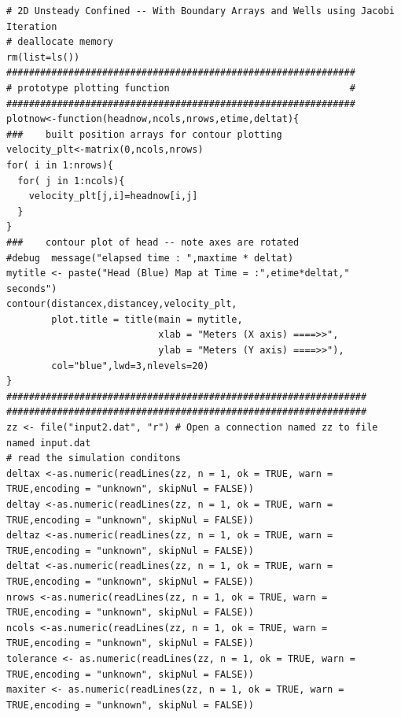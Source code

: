 \begin{lstlisting}[caption= R code demonstrating an Aquifer Flow Simulator for 2D Unsteady Confined Aquifer Flow.  This code fragment implements the Jacobi iteration to solve the linear system at \textbf{each time step}.  A plotting prototype function is used so we can plot to a graphics device at specified intervals (multiples of the total number of time steps).  A graphics device is used (rather than plotting to the \textbf{R Studio} environment) so multiple plots at different simulation times can be rendered , label=lst:2D-Unsteady]
# 2D Unsteady Confined -- With Boundary Arrays and Wells using Jacobi Iteration
# deallocate memory
rm(list=ls())
##############################################################
# prototype plotting function                                #
##############################################################
plotnow<-function(headnow,ncols,nrows,etime,deltat){
###    built position arrays for contour plotting         
velocity_plt<-matrix(0,ncols,nrows) 
for( i in 1:nrows){
  for( j in 1:ncols){
    velocity_plt[j,i]=headnow[i,j]
  }
}
###    contour plot of head -- note axes are rotated
#debug  message("elapsed time : ",maxtime * deltat)
mytitle <- paste("Head (Blue) Map at Time = :",etime*deltat," seconds")
contour(distancex,distancey,velocity_plt,
        plot.title = title(main = mytitle,
                           xlab = "Meters (X axis) ====>>", 
                           ylab = "Meters (Y axis) ====>>"),
        col="blue",lwd=3,nlevels=20)
}
################################################################
################################################################
zz <- file("input2.dat", "r") # Open a connection named zz to file named input.dat
# read the simulation conditons
deltax <-as.numeric(readLines(zz, n = 1, ok = TRUE, warn = TRUE,encoding = "unknown", skipNul = FALSE))
deltay <-as.numeric(readLines(zz, n = 1, ok = TRUE, warn = TRUE,encoding = "unknown", skipNul = FALSE))
deltaz <-as.numeric(readLines(zz, n = 1, ok = TRUE, warn = TRUE,encoding = "unknown", skipNul = FALSE))
deltat <-as.numeric(readLines(zz, n = 1, ok = TRUE, warn = TRUE,encoding = "unknown", skipNul = FALSE))
nrows <-as.numeric(readLines(zz, n = 1, ok = TRUE, warn = TRUE,encoding = "unknown", skipNul = FALSE))
ncols <-as.numeric(readLines(zz, n = 1, ok = TRUE, warn = TRUE,encoding = "unknown", skipNul = FALSE))
tolerance <- as.numeric(readLines(zz, n = 1, ok = TRUE, warn = TRUE,encoding = "unknown", skipNul = FALSE))
maxiter <- as.numeric(readLines(zz, n = 1, ok = TRUE, warn = TRUE,encoding = "unknown", skipNul = FALSE))

\end{lstlisting}
